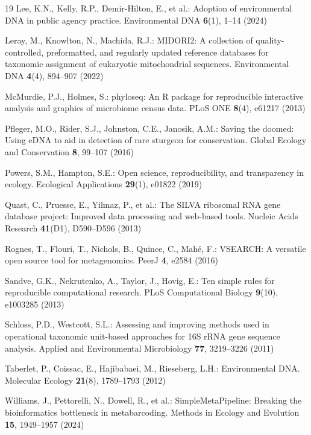 \documentclass[runningheads]{llncs}
\begin{document}
\begin{thebibliography}{19}
Lee, K.N., Kelly, R.P., Demir-Hilton, E., et al.: Adoption of environmental DNA in public agency practice. Environmental DNA \textbf{6}(1), 1--14 (2024)

Leray, M., Knowlton, N., Machida, R.J.: MIDORI2: A collection of quality-controlled, preformatted, and regularly updated reference databases for taxonomic assignment of eukaryotic mitochondrial sequences. Environmental DNA \textbf{4}(4), 894--907 (2022)

McMurdie, P.J., Holmes, S.: phyloseq: An R package for reproducible interactive analysis and graphics of microbiome census data. PLoS ONE \textbf{8}(4), e61217 (2013)

Pfleger, M.O., Rider, S.J., Johnston, C.E., Janosik, A.M.: Saving the doomed: Using eDNA to aid in detection of rare sturgeon for conservation. Global Ecology and Conservation \textbf{8}, 99--107 (2016)

Powers, S.M., Hampton, S.E.: Open science, reproducibility, and transparency in ecology. Ecological Applications \textbf{29}(1), e01822 (2019)

Quast, C., Pruesse, E., Yilmaz, P., et al.: The SILVA ribosomal RNA gene database project: Improved data processing and web-based tools. Nucleic Acids Research \textbf{41}(D1), D590--D596 (2013)

Rognes, T., Flouri, T., Nichols, B., Quince, C., Mah{\'e}, F.: VSEARCH: A versatile open source tool for metagenomics. PeerJ \textbf{4}, e2584 (2016)

Sandve, G.K., Nekrutenko, A., Taylor, J., Hovig, E.: Ten simple rules for reproducible computational research. PLoS Computational Biology \textbf{9}(10), e1003285 (2013)

Schloss, P.D., Westcott, S.L.: Assessing and improving methods used in operational taxonomic unit-based approaches for 16S rRNA gene sequence analysis. Applied and Environmental Microbiology \textbf{77}, 3219--3226 (2011)

Taberlet, P., Coissac, E., Hajibabaei, M., Rieseberg, L.H.: Environmental DNA. Molecular Ecology \textbf{21}(8), 1789--1793 (2012)

Williams, J., Pettorelli, N., Dowell, R., et al.: SimpleMetaPipeline: Breaking the bioinformatics bottleneck in metabarcoding. Methods in Ecology and Evolution \textbf{15}, 1949--1957 (2024)

\end{thebibliography}
\end{document}

